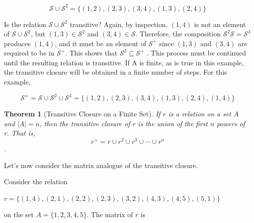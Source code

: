 \documentclass[10pt,]{book}
\theoremstyle{plain}
\newtheorem{theorem}{Theorem}[section]
\theoremstyle{definition}
\theoremstyle{definition}
\theoremstyle{definition}
\theoremstyle{definition}
\begin{document}
\[\mathcal{S} \cup  \mathcal{S}^2 =\{(1, 2), (2, 3), (3, 4), (1, 3), (2, 4)\}\]
%
\par
Is the relation \(\mathcal{S} \cup  \mathcal{S}^2\) transitive? Again, by inspection, \((1, 4)\) is not an element of \(\mathcal{S} \cup  \mathcal{S}^2\), but  \((1,3) \in \mathcal{S}^2\) and \((3, 4) \in \mathcal{S}\). Therefore, the composition \(\mathcal{S}^2 \mathcal{S} = \mathcal{S}^3\) produces \((1, 4)\), and it must be an element of \(\mathcal{S}^+\) since \((1,3)\) and \((3, 4)\) are required to be in \(\mathcal{S}^+\).  This shows that \(\mathcal{S}^3 \subseteq  \mathcal{S} ^+\) . This process must be continued until the resulting relation is transitive. If A is finite, as is true in this example, the transitive closure will be obtained in a finite number of steps. For this example, 

 \[\mathcal{S}^+ =\mathcal{S}\cup \mathcal{S} ^2\cup  \mathcal{S} ^3=\{(1, 2), (2, 3), (3, 4),(1, 3),(2, 4),(1,4)\}\]
\begin{theorem}[Transitive Closure on a Finite Set]\label{theorem-transitive-closure-formula}
If \(r\) is a relation on a set \(A\) and \(\lvert A \rvert = n\), then the transitive closure of \(r\) is the union of the first \(n\) powers of
r.  That is, 
\[r^+ = r \cup  r^2 \cup  r ^3 \cup \cdots  \cup  r^n\].%
\end{theorem}
\par
Let's now consider the matrix analogue of the transitive closure.%
\par
Consider the relation 

\(r = \{(1, 4), (2, 1), (2, 2), (2, 3),(3, 2), (4, 3), (4, 5), (5, 1)\}\) 

on the set \(A = \{1,2, 3, 4, 5\}\). The matrix of \(r\) is
\end{document}
